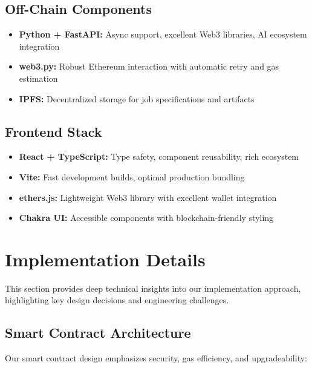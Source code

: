 \subsection{Off-Chain Components}

\begin{itemize}
    \item \textbf{Python + FastAPI:} Async support, excellent Web3 libraries, AI ecosystem integration
    \item \textbf{web3.py:} Robust Ethereum interaction with automatic retry and gas estimation
    \item \textbf{IPFS:} Decentralized storage for job specifications and artifacts
\end{itemize}

\subsection{Frontend Stack}

\begin{itemize}
    \item \textbf{React + TypeScript:} Type safety, component reusability, rich ecosystem
    \item \textbf{Vite:} Fast development builds, optimal production bundling
    \item \textbf{ethers.js:} Lightweight Web3 library with excellent wallet integration
    \item \textbf{Chakra UI:} Accessible components with blockchain-friendly styling
\end{itemize}

\section{Implementation Details}

This section provides deep technical insights into our implementation approach, highlighting key design decisions and engineering challenges.

\subsection{Smart Contract Architecture}

Our smart contract design emphasizes security, gas efficiency, and upgradeability:

